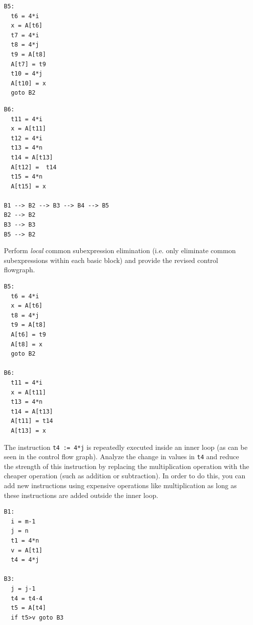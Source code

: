 \documentclass[12pt]{article}
\begin{document}
\begin{exe}
\begin{xlist}
{\begin{soln}
\begin{minipage}[t]{1.5in}
{\begin{verbatim}
B5:
  t6 = 4*i
  x = A[t6]
  t7 = 4*i
  t8 = 4*j
  t9 = A[t8]
  A[t7] = t9
  t10 = 4*j
  A[t10] = x
  goto B2      
    \end{verbatim}
    }
    \end{minipage}
	\begin{minipage}[t]{1.5in}
    {\small
    \begin{verbatim}
B6:
  t11 = 4*i
  x = A[t11]
  t12 = 4*i
  t13 = 4*n
  t14 = A[t13]
  A[t12] =  t14
  t15 = 4*n
  A[t15] = x
  
B1 --> B2 --> B3 --> B4 --> B5
B2 --> B2
B3 --> B3 
B5 --> B2
    \end{verbatim}
    }
    \end{minipage}
    \end{soln}
    }

    {\ex Perform {\em local} common subexpression elimination
      (i.e. only eliminate common subexpressions within each basic
      block) and provide the revised control flowgraph.
    \begin{soln}
	
	{\small
    \begin{verbatim}
B5:
  t6 = 4*i
  x = A[t6]
  t8 = 4*j
  t9 = A[t8]
  A[t6] = t9
  A[t8] = x
  goto B2

B6:
  t11 = 4*i
  x = A[t11]
  t13 = 4*n 
  t14 = A[t13]
  A[t11] = t14
  A[t13] = x
    \end{verbatim}
    }
    \end{soln}
    }

    {\ex The instruction {\tt t4 := 4*j} is repeatedly executed
    inside an inner loop (as can be seen in the control flow graph).
    Analyze the change in values in {\tt t4} and reduce the strength 
    of this instruction by replacing the multiplication operation
    with the cheaper operation (such as addition or subtraction). 
    In order to do this, you can add new instructions using expensive operations like
    multiplication as long as these instructions are added outside the inner loop.
    \begin{soln}

{\small
\begin{verbatim}
B1:
  i = m-1
  j = n
  t1 = 4*n
  v = A[t1]
  t4 = 4*j

B3:
  j = j-1
  t4 = t4-4
  t5 = A[t4]
  if t5>v goto B3
\end{verbatim}
}
    \end{soln}    
    }

\end{xlist}
\end{exe}
\end{document}

